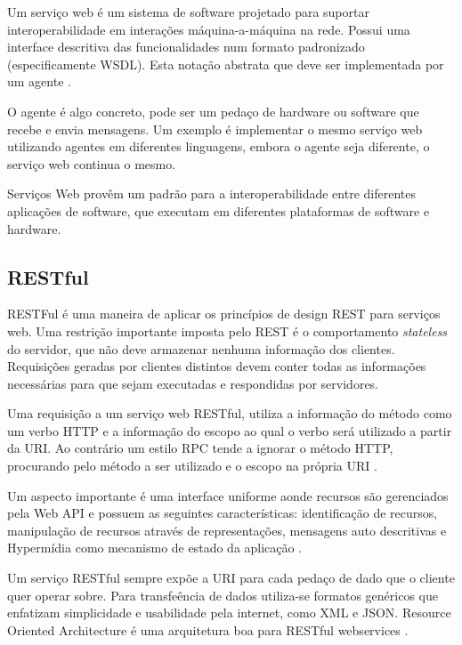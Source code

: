 Um servi\c{c}o web \'e um sistema de software projetado para suportar interoperabilidade em intera\c{c}\~oes m\'aquina-a-m\'aquina na rede. Possui uma interface descritiva das funcionalidades num formato padronizado (especificamente WSDL). Esta nota\c{c}\~ao abstrata que deve ser implementada por um agente \cite{w3c-web-04}.

O agente \'e algo concreto, pode ser um peda\c{c}o de hardware ou software que recebe e envia mensagens. Um exemplo \'e implementar o mesmo servi\c{c}o web utilizando agentes em diferentes linguagens, embora o agente seja diferente, o servi\c{c}o web continua o mesmo.

Servi\c{c}os Web prov\^em um padr\~ao para a interoperabilidade entre diferentes aplica\c{c}\~oes de software, que executam em diferentes plataformas de software e hardware.

\subsection{RESTful}

RESTFul \'e uma maneira de aplicar os princ\'ipios de design REST para servi\c{c}os web. Uma restri\c{c}\~ao importante imposta pelo REST \'e o comportamento \textit{stateless} do servidor, que n\~ao deve armazenar nenhuma informa\c{c}\~ao dos clientes. Requisi\c{c}\~oes geradas por clientes distintos devem conter todas as informa\c{c}\~oes necess\'arias para que sejam executadas e respondidas por servidores.

Uma requisi\c{c}\~ao a um servi\c{c}o web RESTful, utiliza a informa\c{c}\~ao do m\'etodo como um verbo HTTP e a informa\c{c}\~ao do escopo ao qual o verbo ser\'a utilizado a partir da URI. Ao contr\'ario um estilo RPC tende a ignorar o m\'etodo HTTP, procurando pelo m\'etodo a ser utilizado e o escopo na pr\'opria URI .

Um aspecto importante \'e uma interface uniforme aonde recursos s\~ao gerenciados pela Web API e possuem as seguintes caracter\'isticas: identifica\c{c}\~ao de recursos, manipula\c{c}\~ao de recursos atrav\'es de representa\c{c}\~oes, mensagens auto descritivas e Hyperm\'idia como mecanismo de estado da aplica\c{c}\~ao \cite{rest}.

Um servi\c{c}o RESTful sempre exp\~oe a URI para cada peda\c{c}o de dado que o cliente quer operar sobre. Para transfe\^encia de dados utiliza-se formatos gen\'ericos que enfatizam simplicidade e usabilidade pela internet, como XML e JSON. Resource Oriented Architecture \'e uma arquitetura boa para RESTful webservices \cite{richardson2008restful}.

